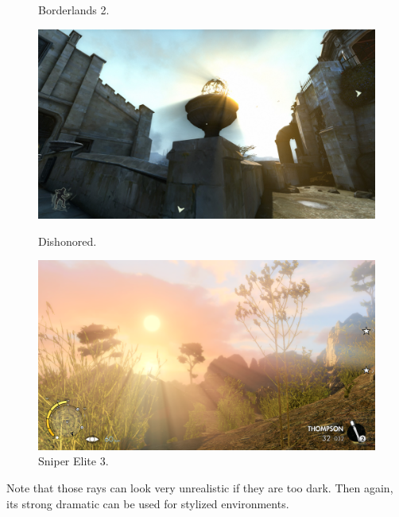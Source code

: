 \documentclass[A4]{article}
\begin{document}
\begin{figure}
		\vspace{-20px}
		\caption{Borderlands 2.}
		\begin{center}
			\includegraphics[scale=0.07]{Dishonored.jpg}
		\end{center}
		\vspace{-20px}
		\caption{Dishonored.}
		\begin{center}
			\includegraphics[scale=0.07]{SniperElite.png}
		\end{center}
		\vspace{-20px}
		\caption{Sniper Elite 3.}	
	\end{figure}
	Note that those rays can look very unrealistic if they are too dark. Then again, its strong dramatic can be used for stylized environments.
	
	\clearpage
	
\end{document}
